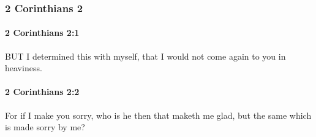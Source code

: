 	\subsubsection{2 Corinthians 2} %
		\label{2CORINTHIANS-2}
		
		\paragraph{2 Corinthians 2:1} %
			\label{2CORINTHIANS-2-1}

			BUT I determined this with myself, that I would not come again to you in heaviness.

			\begin{framed}
			\scriptsize
				\begin{compactdesc}
					\item[SBLG] 
				\end{compactdesc}
			\end{framed}

		\paragraph{2 Corinthians 2:2} %
			\label{2CORINTHIANS-2-2}

			For if I make you sorry, who is he then that maketh me glad, but the same which is made sorry by me?

